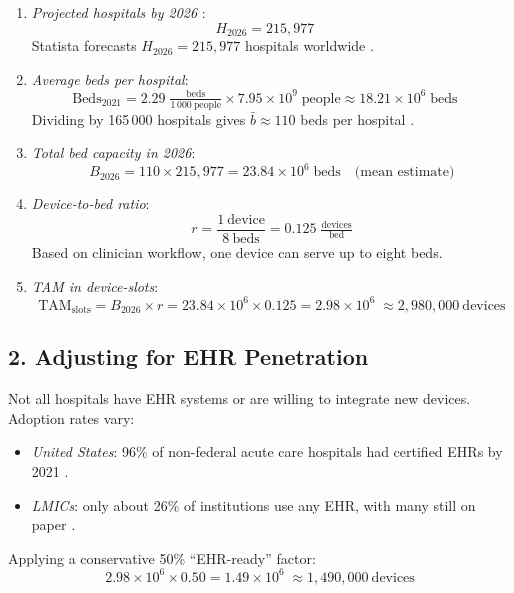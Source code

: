 \documentclass[a4paper,11pt]{article}
\begin{document}
\begin{enumerate}
  \item \emph{Projected hospitals by 2026} \cite{NumberHospitalsWorldwide}:
    \[
      H_{2026} = 215{,}977
      \quad
    \]
    Statista forecasts \(H_{2026}=215{,}977\) hospitals worldwide \cite{HospitalBeds1000,nationsWorldPopulationDay}.
  \item \emph{Average beds per hospital}:
    \[
      \text{Beds}_{2021} = 2.29\;\tfrac{\text{beds}}{1\,000\ \text{people}}
      \times 7.95\times10^{9}\;\text{people}
      \approx 18.21\times10^{6}\;\text{beds}
      \quad
    \]
    Dividing by 165\,000 hospitals gives \(\bar b\approx110\) beds per hospital \cite{85HospitalStatistics}.
  \item \emph{Total bed capacity in 2026}:
    \[
      B_{2026}
      = 110 \times 215{,}977
      = 23.84\times10^{6}\;\text{beds}
      \quad\text{(mean estimate)}
    \]
  \item \emph{Device-to-bed ratio}:
    \[
      r = \frac{1\ \text{device}}{8\ \text{beds}} = 0.125\;\tfrac{\text{devices}}{\text{bed}}
    \]
    Based on clinician workflow, one device can serve up to eight beds.
  \item \emph{TAM in device-slots}:
    \[
      \mathrm{TAM}_{\mathrm{slots}}
      = B_{2026} \times r
      = 23.84\times10^{6} \times 0.125
      = 2.98\times10^{6}
      \;\approx2{,}980{,}000\ \text{devices}
    \]

\end{enumerate}

\subsection*{2. Adjusting for EHR Penetration}

Not all hospitals have EHR systems or are willing to integrate new devices. Adoption rates vary:

\begin{itemize}
  \item \emph{United States}: 96\% of non-federal acute care hospitals had certified EHRs by 2021 \cite{DiscoverMostCommon,desrochesElectronicHealthRecords2008}.
  \item \emph{LMICs}: only about 26\% of institutions use any EHR, with many still on paper \cite{ProgressImplementingUsing2023}.
\end{itemize}

Applying a conservative 50\% “EHR-ready” factor:
\[
  2.98\times10^{6} \times 0.50
  = 1.49\times10^{6}
  \;\approx1{,}490{,}000\ \text{devices}
\]
\end{document}
